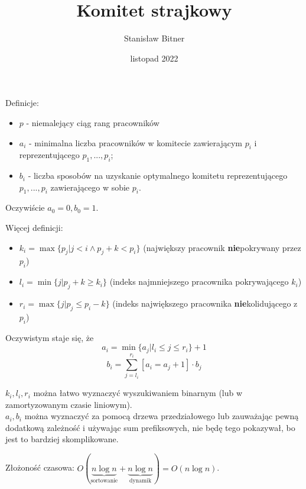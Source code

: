 \documentclass[12pt]{beamer}
\title{Komitet strajkowy}
\author{Stanisław Bitner}
\date{listopad 2022}
\begin{document}
\frame{\titlepage}

\begin{frame}

Definicje:
\begin{itemize}
  \pause\item
    $p$ - niemalejący ciąg rang pracowników
  \pause\item
    $a_i$ - minimalna liczba pracowników w komitecie zawierającym $p_i$ i reprezentującego $p_1, ..., p_i$;
  \pause\item
    $b_i$ - liczba sposobów na uzyskanie optymalnego komitetu reprezentującego $p_1, ..., p_i$ zawierającego w sobie $p_i$.
\end{itemize}

\pause
Oczywiście $a_0 = 0, b_0 = 1$.

\end{frame}

\begin{frame}

Więcej definicji:
\begin{itemize}
  \pause\item
    $k_i = \max\{ p_j | j < i \land p_j + k < p_i \}$ (największy pracownik \textbf{nie}pokrywany przez $p_i$)
  \pause\item
    $l_i = \min\{ j | p_j + k \ge k_i \}$ (indeks najmniejszego pracownika pokrywającego $k_i$)
  \pause\item
    $r_i = \max\{ j | p_j \le p_i - k \}$ (indeks największego pracownika \textbf{nie}kolidującego z $p_i$)
\end{itemize}

\end{frame}

\begin{frame}

Oczywistym staje się, że
$$a_i = \min\{ a_j | l_i \le j \le r_i \} + 1$$
$$b_i = \sum_{j = l_i}^{r_i} [a_i = a_j + 1] \cdot b_j$$
\pause

$k_i, l_i, r_i$ można łatwo wyznaczyć wyszukiwaniem binarnym (lub w zamortyzowanym czasie liniowym).\\
$a_i, b_i$ można wyznaczyć za pomocą drzewa przedziałowego lub zauważając pewną dodatkową zależność i używając sum prefiksowych, nie będę tego pokazywał, bo jest to bardziej skomplikowane.

Złożoność czasowa: $O(\underbrace{n\log n}_{\text{sortowanie}} + \underbrace{n \log n}_{\text{dynamik}}) = O(n\log n)$.

\end{frame}
\end{document}
